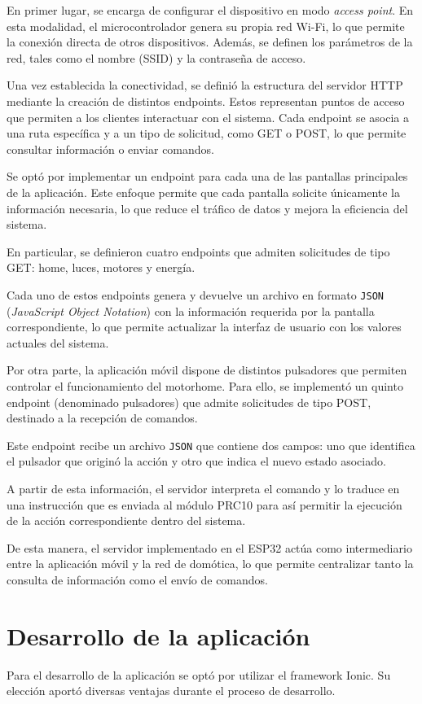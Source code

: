 En primer lugar, se encarga de configurar el dispositivo en modo
\textit{access point}. En esta modalidad, el microcontrolador genera su
propia red Wi-Fi, lo que permite la conexión directa de otros
dispositivos. Además, se definen los parámetros de la red, tales como
el nombre (SSID) y la contraseña de acceso.

Una vez establecida la conectividad, se definió la estructura del
servidor HTTP mediante la creación de distintos endpoints.
Estos representan puntos de acceso que permiten a los clientes
interactuar con el sistema. Cada endpoint se asocia a una ruta
específica y a un tipo de solicitud, como GET o POST, lo que permite
consultar información o enviar comandos.

Se optó por implementar un endpoint para cada una de las
pantallas principales de la aplicación. Este enfoque permite que cada
pantalla solicite únicamente la información necesaria, lo que reduce el
tráfico de datos y mejora la eficiencia del sistema.

En particular, se definieron cuatro endpoints que admiten
solicitudes de tipo GET: home, luces, motores y energía.

Cada uno de estos endpoints genera y devuelve un archivo en
formato \texttt{JSON} (\textit{JavaScript Object Notation}) \citep{web_json} con la información requerida por la pantalla
correspondiente, lo que permite actualizar la interfaz de usuario con
los valores actuales del sistema.

Por otra parte, la aplicación móvil dispone de distintos pulsadores que
permiten controlar el funcionamiento del motorhome. Para ello, se
implementó un quinto endpoint (denominado pulsadores) que admite solicitudes de tipo
POST, destinado a la recepción de comandos.

Este endpoint recibe un archivo \texttt{JSON} que contiene dos campos:
uno que identifica el pulsador que originó la acción y otro que indica
el nuevo estado asociado.

A partir de esta información, el servidor interpreta el comando y lo
traduce en una instrucción que es enviada al módulo PRC10 para así permitir
la ejecución de la acción correspondiente dentro del sistema.

De esta manera, el servidor implementado en el ESP32 actúa como intermediario entre la aplicación móvil y la red de domótica, lo que permite centralizar tanto la consulta de información como el envío de comandos.

\section{Desarrollo de la aplicación}
\label{sec:desarrollo_app}
Para el desarrollo de la aplicación se optó por utilizar el framework
Ionic. Su elección aportó diversas ventajas durante el proceso de
desarrollo.

